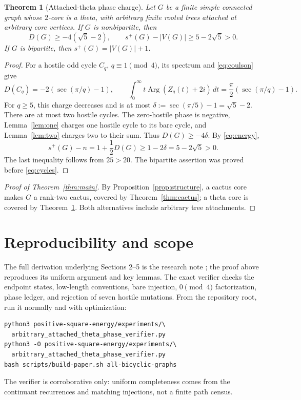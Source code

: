 \documentclass[11pt]{article}
\newtheorem{theorem}{Theorem}[section]
\theoremstyle{remark}
\newcommand{\splus}{s^+}
\newcommand{\Arg}{\operatorname{Arg}}
\begin{document}
\begin{theorem}[Attached-theta phase charge]\label{thm:theta}
Let $G$ be a finite simple connected graph whose $2$-core is a theta, with
arbitrary finite rooted trees attached at arbitrary core vertices.  If $G$ is
nonbipartite, then
\begin{equation}\label{eq:theta-bound}
 D(G)\geq-4(\sqrt5-2),
 \qquad \splus(G)-|V(G)|\geq5-2\sqrt5>0.
\end{equation}
If $G$ is bipartite, then $\splus(G)=|V(G)|+1$.
\end{theorem}

\begin{proof}
For a hostile odd cycle $C_q$, $q\equiv1\pmod4$, its spectrum and
\eqref{eq:coulson} give
\begin{equation}\label{eq:cycle-charge}
 D(C_q)=-2(\sec(\pi/q)-1),
 \qquad
 \int_0^\infty t\Arg(Z_q(t)+2i)\,dt
 =\frac\pi2(\sec(\pi/q)-1).
\end{equation}
For $q\geq5$, this charge decreases and is at most
$\delta:=\sec(\pi/5)-1=\sqrt5-2$.  There are at most two hostile cycles.
The zero-hostile phase is negative, Lemma~\ref{lem:one} charges one hostile
cycle to its bare cycle, and Lemma~\ref{lem:two} charges two to their sum.
Thus $D(G)\geq-4\delta$.  By \eqref{eq:energy},
\[
 \splus(G)-n=1+\frac12D(G)
 \geq1-2\delta=5-2\sqrt5>0.
\]
The last inequality follows from $25>20$.  The bipartite assertion was proved
before \eqref{eq:cycles}.
\end{proof}

\begin{proof}[Proof of Theorem~\ref{thm:main}]
By Proposition~\ref{prop:structure}, a cactus core makes $G$ a rank-two
cactus, covered by Theorem~\ref{thm:cactus}; a theta core is covered by
Theorem~\ref{thm:theta}.  Both alternatives include arbitrary tree attachments.
\end{proof}

\section{Reproducibility and scope}

The full derivation underlying Sections 2--5 is the research note
\cite{ThetaNote}; the proof above reproduces its uniform argument and key
lemmas.  The exact verifier \cite{ThetaVerify} checks the endpoint states,
low-length conventions, bare injection, $0\pmod4$ factorization, phase ledger,
and rejection of seven hostile mutations.  From the repository root, run it
normally and with optimization:
\begin{verbatim}
python3 positive-square-energy/experiments/\
  arbitrary_attached_theta_phase_verifier.py
python3 -O positive-square-energy/experiments/\
  arbitrary_attached_theta_phase_verifier.py
bash scripts/build-paper.sh all-bicyclic-graphs
\end{verbatim}
The verifier is corroborative only: uniform completeness comes from the
continuant recurrences and matching injections, not a finite path census.
\end{document}
